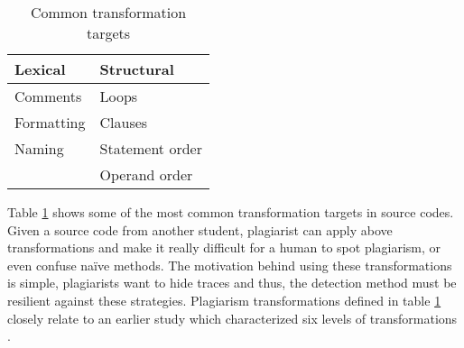 \begin{table}[ht]
\centering
\caption{Common transformation targets}
\label{tbl-plag-strat}
\begin{tabular}{|l|l|} \hline
 \textbf{Lexical} & \textbf{Structural} \\ \hline
 Comments                    & Loops                          \\
 Formatting                  & Clauses                        \\
 Naming                      & Statement order                \\
                             & Operand order               \\ \hline
\end{tabular}
\end{table}

\noindent
Table \ref{tbl-plag-strat} shows some of the most common transformation targets in source codes. Given a source code from another student, plagiarist can apply above transformations and make it really difficult for a human to spot plagiarism, or even confuse naïve methods. The motivation behind using these transformations is simple, plagiarists want to hide traces and thus, the detection method must be resilient against these strategies. Plagiarism transformations defined in table \ref{tbl-plag-strat} closely relate to an earlier study which characterized six levels of transformations \cite{Faidhi:1987:EAD:27319.27321}.

\begin{table}[ht]
\centering
\caption{Transformation levels}
\label{tbl-plag-transf}
\end{table}

